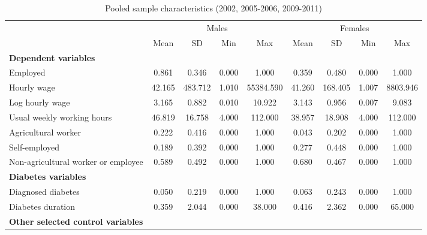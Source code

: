 \documentclass[12pt,english,british]{article}
\newcommand{\sym}[1]{\rlap{#1}}%
\begin{document}
\begin{table}[h]
\caption{\label{tab:Pooled-sample-characteristics}Pooled sample characteristics (2002, 2005-2006, 2009-2011)}
\begin{center}
\begin{adjustbox}{max width=\textwidth}

{ \def\sym#1{\ifmmode^{#1}\else\(^{#1}\)\fi} \begin{tabular}{l*{2}{cccc}}
\toprule
                    &\multicolumn{4}{c}{Males}                          &\multicolumn{4}{c}{Females}                        \\
                    &        Mean&          SD&         Min&         Max&        Mean&          SD&         Min&         Max\\
\midrule
\textbf{Dependent variables} &&&&&&&& \\
Employed            &       0.861&       0.346&       0.000&       1.000&       0.359&       0.480&       0.000&       1.000\\
Hourly wage             &      42.165&     483.712&       1.010&   55384.590&      41.260&     168.405&       1.007&    8803.946\\
Log hourly wage     &       3.165&       0.882&       0.010&      10.922&       3.143&       0.956&       0.007&       9.083\\
Usual weekly working hours&      46.819&      16.758&       4.000&     112.000&      38.957&      18.908&       4.000&     112.000\\
Agricultural worker &       0.222&       0.416&       0.000&       1.000&       0.043&       0.202&       0.000&       1.000\\
Self-employed       &       0.189&       0.392&       0.000&       1.000&       0.277&       0.448&       0.000&       1.000\\
Non-agricultural worker or employee&       0.589&       0.492&       0.000&       1.000&       0.680&       0.467&       0.000&       1.000\\
\textbf{Diabetes variables} &&&&&&&& \\
Diagnosed diabetes  &       0.050&       0.219&       0.000&       1.000&       0.063&       0.243&       0.000&       1.000\\
Diabetes duration   &       0.359&       2.044&       0.000&      38.000&       0.416&       2.362&       0.000&      65.000\\
\textbf{Other selected control variables} &&&&&&&& \\

\end{tabular}}
\end{adjustbox}
\end{center}
\end{table}
\end{document}
